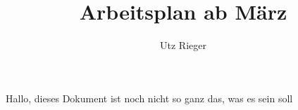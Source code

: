 \documentclass[11pt,a4paper]{article}
\author{Utz Rieger}
\title{Arbeitsplan ab März}
\begin{document}
Hallo, dieses Dokument ist noch nicht so ganz das, was es sein soll
\end{document}
